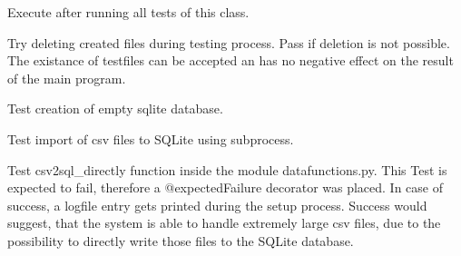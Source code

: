 \documentclass[letterpaper,10pt,english]{sphinxmanual}
\begin{document}
\begin{fulllineitems}
\begin{fulllineitems}
\label{\detokenize{_autosummary/tests.test_unit.test_sqlite:tests.test_unit.test_sqlite.tearDownClass}}
\pysigstartsignatures
{}
\pysigstopsignatures
\sphinxAtStartPar
Execute after running  all tests of this class.

\sphinxAtStartPar
Try deleting created files during testing process. Pass if deletion is
not possible. The existance of test\sphinxhyphen{}files can be accepted an has no
negative effect on the result of the main program.

\end{fulllineitems}


\begin{fulllineitems}
\label{\detokenize{_autosummary/tests.test_unit.test_sqlite:tests.test_unit.test_sqlite.test_creation}}
\pysigstartsignatures
{}
\pysigstopsignatures
\sphinxAtStartPar
Test creation of empty sqlite database.

\end{fulllineitems}


\begin{fulllineitems}
\label{\detokenize{_autosummary/tests.test_unit.test_sqlite:tests.test_unit.test_sqlite.test_table_from_csv}}
\pysigstartsignatures
{}
\pysigstopsignatures
\sphinxAtStartPar
Test import of csv files to SQLite using subprocess.

\sphinxAtStartPar
Test csv2sql\_directly function inside the module datafunctions.py.
This Test is expected to fail, therefore a @expectedFailure decorator
was placed. In case of success, a log\sphinxhyphen{}file entry gets printed during
the setup process. Success would suggest, that the system is able to
handle extremely large csv files, due to the possibility to directly
write those files to the SQLite database.

\end{fulllineitems}


\end{fulllineitems}
\end{document}
